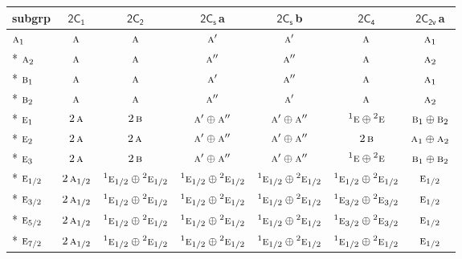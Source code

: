 \documentclass[10pt,a4paper]{article}
\numberwithin{equation}{section}
\newcommand{\grp}[1]{\mathsf{#1}}
\newcommand{\irr}[1]{\text{\normalfont\scshape #1}}
\newcommand{\conjpair}[1]{{}^{#1}}
\newcommand{\clsletter}[1]{\,{\scriptsize\color{black!55}#1}}
\begin{document}
{\small\begin{longtable}{@{}lcccccc@{}}\toprule
subgrp & \href{2C1.pdf}{$\grp{2C_{1}}$} & \href{2C2.pdf}{$\grp{2C_{2}}$} & \href{2C1v.pdf}{$\grp{2C_{s}}$}\clsletter{a} & \href{2C1v.pdf}{$\grp{2C_{s}}$}\clsletter{b} & \href{2C4.pdf}{$\grp{2C_{4}}$} & \href{2C2v.pdf}{$\grp{2C_{2v}}$}\clsletter{a}\\\midrule\endhead
\bottomrule\endfoot\endlastfoot
$\irr{a}_{1}$ & $\irr{a}$ & $\irr{a}$ & $\irr{a}'$ & $\irr{a}'$ & $\irr{a}$ & $\irr{a}_{1}$\\*
$\irr{a}_{2}$ & $\irr{a}$ & $\irr{a}$ & $\irr{a}''$ & $\irr{a}''$ & $\irr{a}$ & $\irr{a}_{2}$\\*
$\irr{b}_{1}$ & $\irr{a}$ & $\irr{a}$ & $\irr{a}'$ & $\irr{a}''$ & $\irr{a}$ & $\irr{a}_{1}$\\*
$\irr{b}_{2}$ & $\irr{a}$ & $\irr{a}$ & $\irr{a}''$ & $\irr{a}'$ & $\irr{a}$ & $\irr{a}_{2}$\\*
$\irr{e}_{1}$ & $2\,\irr{a}$ & $2\,\irr{b}$ & $\irr{a}'\oplus \irr{a}''$ & $\irr{a}'\oplus \irr{a}''$ & $\conjpair{1}\irr{e}\oplus \conjpair{2}\irr{e}$ & $\irr{b}_{1}\oplus \irr{b}_{2}$\\*
$\irr{e}_{2}$ & $2\,\irr{a}$ & $2\,\irr{a}$ & $\irr{a}'\oplus \irr{a}''$ & $\irr{a}'\oplus \irr{a}''$ & $2\,\irr{b}$ & $\irr{a}_{1}\oplus \irr{a}_{2}$\\*
$\irr{e}_{3}$ & $2\,\irr{a}$ & $2\,\irr{b}$ & $\irr{a}'\oplus \irr{a}''$ & $\irr{a}'\oplus \irr{a}''$ & $\conjpair{1}\irr{e}\oplus \conjpair{2}\irr{e}$ & $\irr{b}_{1}\oplus \irr{b}_{2}$\\*
$\irr{e}_{1/2}$ & $2\,\irr{a}_{1/2}$ & $\conjpair{1}\irr{e}_{1/2}\oplus \conjpair{2}\irr{e}_{1/2}$ & $\conjpair{1}\irr{e}_{1/2}\oplus \conjpair{2}\irr{e}_{1/2}$ & $\conjpair{1}\irr{e}_{1/2}\oplus \conjpair{2}\irr{e}_{1/2}$ & $\conjpair{1}\irr{e}_{1/2}\oplus \conjpair{2}\irr{e}_{1/2}$ & $\irr{e}_{1/2}$\\*
$\irr{e}_{3/2}$ & $2\,\irr{a}_{1/2}$ & $\conjpair{1}\irr{e}_{1/2}\oplus \conjpair{2}\irr{e}_{1/2}$ & $\conjpair{1}\irr{e}_{1/2}\oplus \conjpair{2}\irr{e}_{1/2}$ & $\conjpair{1}\irr{e}_{1/2}\oplus \conjpair{2}\irr{e}_{1/2}$ & $\conjpair{1}\irr{e}_{3/2}\oplus \conjpair{2}\irr{e}_{3/2}$ & $\irr{e}_{1/2}$\\*
$\irr{e}_{5/2}$ & $2\,\irr{a}_{1/2}$ & $\conjpair{1}\irr{e}_{1/2}\oplus \conjpair{2}\irr{e}_{1/2}$ & $\conjpair{1}\irr{e}_{1/2}\oplus \conjpair{2}\irr{e}_{1/2}$ & $\conjpair{1}\irr{e}_{1/2}\oplus \conjpair{2}\irr{e}_{1/2}$ & $\conjpair{1}\irr{e}_{3/2}\oplus \conjpair{2}\irr{e}_{3/2}$ & $\irr{e}_{1/2}$\\*
$\irr{e}_{7/2}$ & $2\,\irr{a}_{1/2}$ & $\conjpair{1}\irr{e}_{1/2}\oplus \conjpair{2}\irr{e}_{1/2}$ & $\conjpair{1}\irr{e}_{1/2}\oplus \conjpair{2}\irr{e}_{1/2}$ & $\conjpair{1}\irr{e}_{1/2}\oplus \conjpair{2}\irr{e}_{1/2}$ & $\conjpair{1}\irr{e}_{1/2}\oplus \conjpair{2}\irr{e}_{1/2}$ & $\irr{e}_{1/2}$\\
\bottomrule\end{longtable}}
\end{document}
